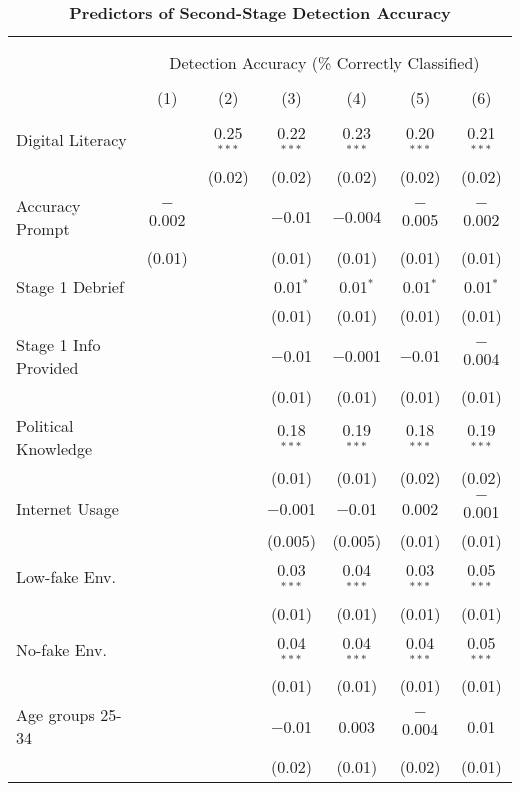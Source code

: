 
\begin{table}[!htbp] \centering 
  \caption{\textbf{Predictors of Second-Stage Detection Accuracy}} 
  \label{secondstage_accuracy} 
\footnotesize 
\begin{tabular}{@{\extracolsep{1pt}}lcccccc} 
\\[-1.8ex]\hline 
\hline \\[-1.8ex] 
\\[-1.8ex] & \multicolumn{6}{c}{\normalsize Detection Accuracy (\% Correctly Classified)} \\ 
\\[-1.8ex] & (1) & (2) & (3) & (4) & (5) & (6)\\ 
\hline \\[-1.8ex] 
 Digital Literacy &  & 0.25$^{***}$ & 0.22$^{***}$ & 0.23$^{***}$ & 0.20$^{***}$ & 0.21$^{***}$ \\ 
  &  & (0.02) & (0.02) & (0.02) & (0.02) & (0.02) \\ 
  Accuracy Prompt & $-$0.002 &  & $-$0.01 & $-$0.004 & $-$0.005 & $-$0.002 \\ 
  & (0.01) &  & (0.01) & (0.01) & (0.01) & (0.01) \\ 
  Stage 1 Debrief &  &  & 0.01$^{*}$ & 0.01$^{*}$ & 0.01$^{*}$ & 0.01$^{*}$ \\ 
  &  &  & (0.01) & (0.01) & (0.01) & (0.01) \\ 
  Stage 1 Info Provided &  &  & $-$0.01 & $-$0.001 & $-$0.01 & $-$0.004 \\ 
  &  &  & (0.01) & (0.01) & (0.01) & (0.01) \\ 
  Political Knowledge &  &  & 0.18$^{***}$ & 0.19$^{***}$ & 0.18$^{***}$ & 0.19$^{***}$ \\ 
  &  &  & (0.01) & (0.01) & (0.02) & (0.02) \\ 
  Internet Usage &  &  & $-$0.001 & $-$0.01 & 0.002 & $-$0.001 \\ 
  &  &  & (0.005) & (0.005) & (0.01) & (0.01) \\ 
  Low-fake Env. &  &  & 0.03$^{***}$ & 0.04$^{***}$ & 0.03$^{***}$ & 0.05$^{***}$ \\ 
  &  &  & (0.01) & (0.01) & (0.01) & (0.01) \\ 
  No-fake Env. &  &  & 0.04$^{***}$ & 0.04$^{***}$ & 0.04$^{***}$ & 0.05$^{***}$ \\ 
  &  &  & (0.01) & (0.01) & (0.01) & (0.01) \\ 
  Age groups 25-34 &  &  & $-$0.01 & 0.003 & $-$0.004 & 0.01 \\ 
  &  &  & (0.02) & (0.01) & (0.02) & (0.01) \\ 

\end{tabular}
\end{table}
